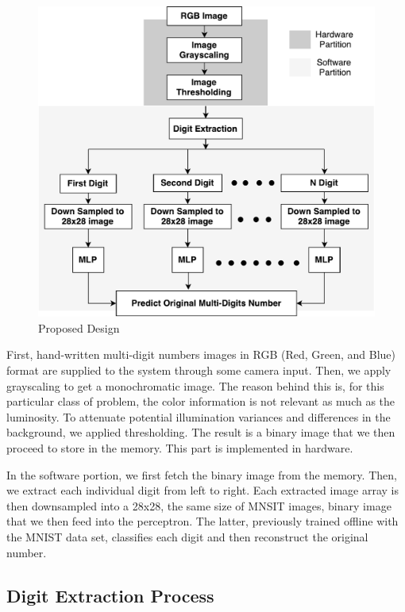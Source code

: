 \documentclass[sigconf]{acmart}
\theoremstyle{plain}
\theoremstyle{remark}
\begin{document}
\begin{figure} [H]
\centering
\includegraphics[width=.9\linewidth]{FPLDiagram2.pdf}
\caption{Proposed Design}
\label{fig:proposed_design}
\end{figure}

First, hand-written multi-digit numbers images in RGB (Red, Green, and Blue) format are supplied to the system through some camera input. Then, we apply grayscaling to get a monochromatic image. The reason behind this is, for this particular class of problem, the color information is not relevant as much as the luminosity. To attenuate potential illumination variances and differences in the background, we applied thresholding. The result is a binary image that we then proceed to store in the memory. This part is implemented in hardware. 

In the software portion, we first fetch the binary image from the memory. Then, we extract each individual digit from left to right. Each extracted image array is then downsampled into a 28x28, the same size of MNSIT images, binary image that we then feed into the perceptron. The latter, previously trained offline with the MNIST data set, classifies each digit and then reconstruct the original number.

\subsection{Digit Extraction Process}
\end{document}
